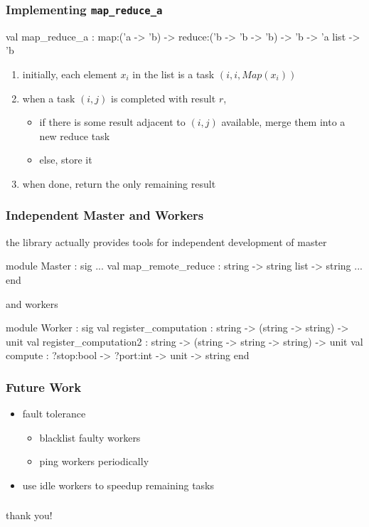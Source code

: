 \documentclass{beamer}
\let\emph\alert
\begin{document}
\begin{frame}\frametitle{Implementing \texttt{map\_reduce\_a}}
  \begin{ocaml}
val map_reduce_a :
  map:('a -> 'b) -> reduce:('b -> 'b -> 'b) -> 
  'b -> 'a list -> 'b
  \end{ocaml}


  \begin{enumerate}
  \item initially, each element $x_i$ in the list is a task $(i,i,Map(x_i))$
  \item when a task $(i,j)$ is completed with result $r$,
    \begin{itemize}
    \item if there is some result adjacent to $(i,j)$ available,
      merge them into a new reduce task
    \item else, store it
    \end{itemize}
  \item when done, return the only remaining result
  \end{enumerate}
\end{frame}


\begin{frame}\frametitle{Independent Master and Workers}
  the library actually provides tools for independent development of
  master \small

  \begin{ocaml}
module Master : sig
  ...
  val map_remote_reduce : string -> string list -> string
  ...
end
  \end{ocaml}

and workers\small

  \begin{ocaml}
module Worker : sig
  val register_computation : 
    string -> (string -> string) -> unit
  val register_computation2 : 
    string -> (string -> string -> string) -> unit
  val compute : 
    ?stop:bool -> ?port:int -> unit -> string
end
  \end{ocaml}
\end{frame}

\begin{frame}\frametitle{Future Work}
  \begin{itemize}
  \item fault tolerance
    \begin{itemize}
    \item blacklist faulty workers
    \item ping workers periodically
    \end{itemize}
  \item use idle workers to speedup remaining tasks
  \end{itemize}
\end{frame}

\begin{frame}\frametitle{}
  \begin{center}
    \emph{thank you!}
  \end{center}
\end{frame}
\end{document}
